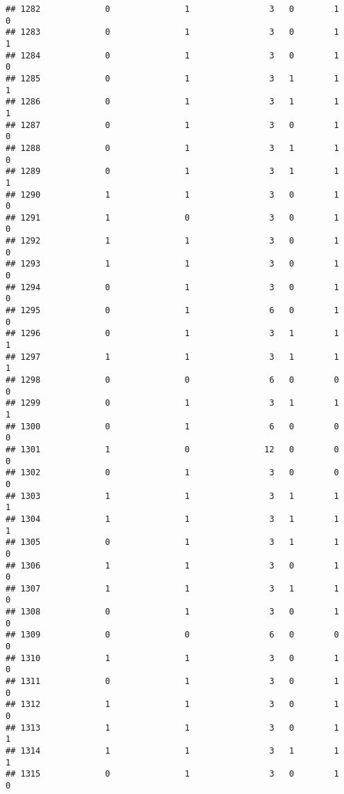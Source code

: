 \documentclass[]{article}
\begin{document}
\begin{verbatim}
## 1282             0               1                3   0        1        0
## 1283             0               1                3   0        1        1
## 1284             0               1                3   0        1        0
## 1285             0               1                3   1        1        1
## 1286             0               1                3   1        1        1
## 1287             0               1                3   0        1        0
## 1288             0               1                3   1        1        0
## 1289             0               1                3   1        1        1
## 1290             1               1                3   0        1        0
## 1291             1               0                3   0        1        0
## 1292             1               1                3   0        1        0
## 1293             1               1                3   0        1        0
## 1294             0               1                3   0        1        0
## 1295             0               1                6   0        1        0
## 1296             0               1                3   1        1        1
## 1297             1               1                3   1        1        1
## 1298             0               0                6   0        0        0
## 1299             0               1                3   1        1        1
## 1300             0               1                6   0        0        0
## 1301             1               0               12   0        0        0
## 1302             0               1                3   0        0        0
## 1303             1               1                3   1        1        1
## 1304             1               1                3   1        1        1
## 1305             0               1                3   1        1        0
## 1306             1               1                3   0        1        0
## 1307             1               1                3   1        1        0
## 1308             0               1                3   0        1        0
## 1309             0               0                6   0        0        0
## 1310             1               1                3   0        1        0
## 1311             0               1                3   0        1        0
## 1312             1               1                3   0        1        0
## 1313             1               1                3   0        1        1
## 1314             1               1                3   1        1        1
## 1315             0               1                3   0        1        0

\end{verbatim}
\end{document}

